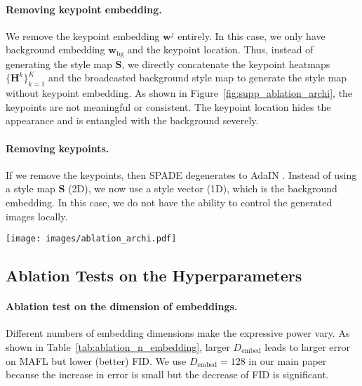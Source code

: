 \documentclass[10pt, conference, compsocconf]{IEEEtran}
\newcommand{\vw}{\mathbf{w}}
\newcommand{\mH}{\mathbf{H}}
\newcommand{\mS}{\mathbf{S}}
\begin{document}
\paragraph{Removing keypoint embedding.} We remove the keypoint embedding $\vw^j$ entirely. In this case, we only have background embedding $\vw_\text{bg}$ and the keypoint location. Thus, instead of generating the style map $\mS$, we directly concatenate the keypoint heatmaps $\{\mH^k\}_{k=1}^K$ and the broadcasted background style map to generate the style map without keypoint embedding. As shown in Figure~\ref{fig:supp_ablation_archi}, the keypoints are not meaningful or consistent. The keypoint location hides the appearance and is entangled with the background severely.

\paragraph{Removing keypoints.} If we remove the keypoints, then SPADE \cite{park2019semantic} degenerates to AdaIN \cite{huang2017arbitrary}. Instead of using a style map $\mS$ (2D), we now use a style vector (1D), which is the background embedding. In this case, we do not have the ability to control the generated images locally.



\begin{figure*}[t]
\begin{center}
  \texttt{[image: images/ablation\_archi.pdf]}
\end{center}
  \caption{\textbf{Ablation study on architecture}. We show the keypoints for different architectures.}
\label{fig:supp_ablation_archi}
\end{figure*}


\subsection{Ablation Tests on the Hyperparameters}

\paragraph{Ablation test on the dimension of embeddings.} Different numbers of embedding dimensions make the expressive power vary. As shown in Table~\ref{tab:ablation_n_embedding}, larger $D_\text{embed}$ leads to larger error on MAFL but lower (better) FID. We use $D_\text{embed}=128$ in our main paper because the increase in error is small but the decrease of FID is significant.
\end{document}

